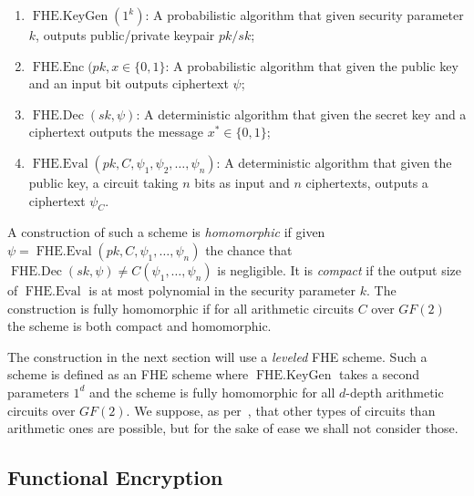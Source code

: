 \documentclass[11pt, a4paper]{article}
\newcommand{\op}[1]{\operatorname{#1}}
\begin{document}
\begin{enumerate}
    \item $\op{FHE.KeyGen}(1^k)$: A probabilistic algorithm that given security parameter $k$, outputs public/private keypair $pk/sk$;
    \item $\op{FHE.Enc}(pk, x \in \{0,1\}$: A probabilistic algorithm that given the public key and an input bit outputs ciphertext $\psi$;
    \item $\op{FHE.Dec}(sk, \psi)$: A deterministic algorithm that given the secret key and a ciphertext outputs the message $x^* \in \{0,1\}$;
    \item $\op{FHE.Eval}(pk, C, \psi_1, \psi_2, \dots, \psi_n)$: A deterministic algorithm that given the public key, a circuit taking $n$ bits as input and $n$ ciphertexts, outputs a ciphertext $\psi_C$.
\end{enumerate}

A construction of such a scheme is \emph{homomorphic} if given $\psi = \op{FHE.Eval}(pk, C, \psi_1, \dots, \psi_n)$ the chance that $\op{FHE.Dec}(sk, \psi) \neq C(\psi_1, \dots, \psi_n)$ is negligible.
It is \emph{compact} if the output size of $\op{FHE.Eval}$ is at most polynomial in the security parameter $k$.
The construction is fully homomorphic if for all arithmetic circuits $C$ over $GF(2)$ the scheme is both compact and homomorphic.

The construction in the next section will use a \emph{leveled} FHE scheme.
Such a scheme is defined as an FHE scheme where $\op{FHE.KeyGen}$ takes a second parameters $1^d$ and the scheme is fully homomorphic for all $d$-depth arithmetic circuits over $GF(2)$.
We suppose, as per~\cite{vaikuntanathan2011computing}, that other types of circuits than arithmetic ones are possible, but for the sake of ease we shall not consider those.

\subsection{Functional Encryption}
\end{document}
